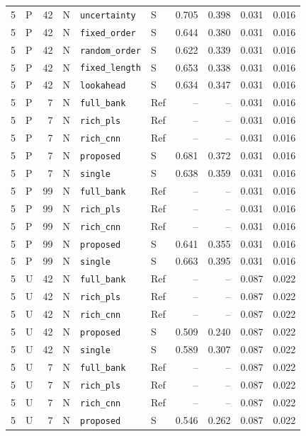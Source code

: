 \documentclass[10pt,a4paper]{article}
\begin{document}
\begin{longtable}{rlrlllrrrr}
5 & P & 42 & N & \texttt{uncertainty} & S & 0.705 & 0.398 & 0.031 & 0.016 \\
5 & P & 42 & N & \texttt{fixed\_order} & S & 0.644 & 0.380 & 0.031 & 0.016 \\
5 & P & 42 & N & \texttt{random\_order} & S & 0.622 & 0.339 & 0.031 & 0.016 \\
5 & P & 42 & N & \texttt{fixed\_length} & S & 0.653 & 0.338 & 0.031 & 0.016 \\
5 & P & 42 & N & \texttt{lookahead} & S & 0.634 & 0.347 & 0.031 & 0.016 \\
5 & P & 7 & N & \texttt{full\_bank} & Ref & -- & -- & 0.031 & 0.016 \\
5 & P & 7 & N & \texttt{rich\_pls} & Ref & -- & -- & 0.031 & 0.016 \\
5 & P & 7 & N & \texttt{rich\_cnn} & Ref & -- & -- & 0.031 & 0.016 \\
5 & P & 7 & N & \texttt{proposed} & S & 0.681 & 0.372 & 0.031 & 0.016 \\
5 & P & 7 & N & \texttt{single} & S & 0.638 & 0.359 & 0.031 & 0.016 \\
5 & P & 99 & N & \texttt{full\_bank} & Ref & -- & -- & 0.031 & 0.016 \\
5 & P & 99 & N & \texttt{rich\_pls} & Ref & -- & -- & 0.031 & 0.016 \\
5 & P & 99 & N & \texttt{rich\_cnn} & Ref & -- & -- & 0.031 & 0.016 \\
5 & P & 99 & N & \texttt{proposed} & S & 0.641 & 0.355 & 0.031 & 0.016 \\
5 & P & 99 & N & \texttt{single} & S & 0.663 & 0.395 & 0.031 & 0.016 \\
5 & U & 42 & N & \texttt{full\_bank} & Ref & -- & -- & 0.087 & 0.022 \\
5 & U & 42 & N & \texttt{rich\_pls} & Ref & -- & -- & 0.087 & 0.022 \\
5 & U & 42 & N & \texttt{rich\_cnn} & Ref & -- & -- & 0.087 & 0.022 \\
5 & U & 42 & N & \texttt{proposed} & S & 0.509 & 0.240 & 0.087 & 0.022 \\
5 & U & 42 & N & \texttt{single} & S & 0.589 & 0.307 & 0.087 & 0.022 \\
5 & U & 7 & N & \texttt{full\_bank} & Ref & -- & -- & 0.087 & 0.022 \\
5 & U & 7 & N & \texttt{rich\_pls} & Ref & -- & -- & 0.087 & 0.022 \\
5 & U & 7 & N & \texttt{rich\_cnn} & Ref & -- & -- & 0.087 & 0.022 \\
5 & U & 7 & N & \texttt{proposed} & S & 0.546 & 0.262 & 0.087 & 0.022 \\

\end{longtable}
\end{document}
